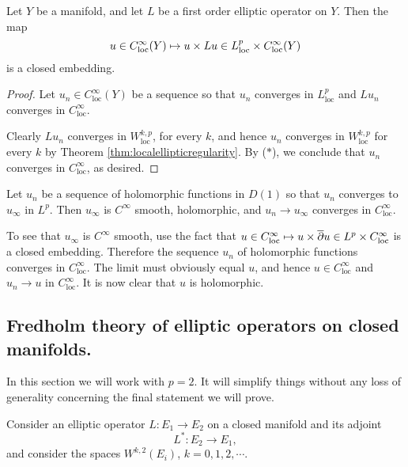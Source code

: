  \begin{thm}
   Let $Y$ be a manifold, and let $L$ be a first order elliptic
   operator on $Y$. Then the map
   \begin{equation*}
     u\in C^{\infty}_{\text{loc}}(Y)\mapsto u\times Lu\in
     L^{p}_{\text{loc}}\times C^{\infty}_{\text{loc}}(Y)
   \end{equation*}
   is a closed embedding. 
 \end{thm}
 \begin{proof}
   Let $u_{n}\in C^{\infty}_{\text{loc}}(Y)$ be a sequence so that
   $u_{n}$ converges in $L^{p}_{\text{loc}}$ and $Lu_{n}$ converges in
   $C^{\infty}_{\text{loc}}$.

   Clearly $Lu_{n}$ converges in $W^{k,p}_{\text{loc}}$, for every
   $k$, and hence $u_{n}$ converges in $W^{k,p}_{\text{loc}}$ for
   every $k$ by Theorem \ref{thm:localellipticregularity}. By
   ($\ast$), we conclude that $u_{n}$ converges in
   $C^{\infty}_{\text{loc}}$, as desired.
 \end{proof}
 \begin{example}
   Let $u_{n}$ be a sequence of holomorphic functions in $D(1)$ so
   that $u_{n}$ converges to $u_{\infty}$ in $L^{p}$. Then
   $u_{\infty}$ is $C^{\infty}$ smooth, holomorphic, and $u_{n}\to
   u_{\infty}$ converges in $C^{\infty}_{\text{loc}}$.

   To see that $u_{\infty}$ is $C^{\infty}$ smooth, use the fact that
   $u\in C^{\infty}_{\text{loc}}\mapsto u\times \overline{\partial} u\in
   L^{p}\times C^{\infty}_{\text{loc}}$ is a closed
   embedding. Therefore the sequence $u_{n}$ of holomorphic functions
   converges in $C^{\infty}_{\text{loc}}$. The limit must obviously
   equal $u$, and hence $u\in C^{\infty}_{\text{loc}}$ and
   $u_{n}\to u$ in $C^{\infty}_{\text{loc}}$. It is now clear that $u$
   is holomorphic.
 \end{example}
  \subsection*{Fredholm theory of elliptic operators on closed
   manifolds.}
 In this section we will work with $p=2$. It will simplify things without
 any loss of generality concerning the final statement we will prove.

 Consider an elliptic operator $L:E_{1}\to E_{2}$ on a closed manifold
 and its adjoint $$L^{*}:E_{2}\to E_{1},$$ and consider the spaces
 $W^{k,2}(E_{i})$, $k=0,1,2,\cdots.$%
 
